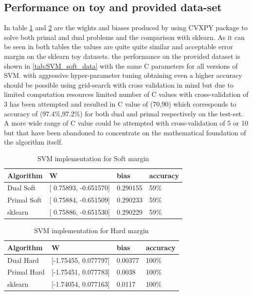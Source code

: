 \documentclass[10pt,twocolumn,letterpaper]{article}
\begin{document}
\subsection{Performance on toy and provided data-set}
In table \ref{tab:SVM_soft} and \ref{tab:SVM_hard} are the wights and biases produced by using CVXPY package to solve both primal and dual problems and the comparison with sklearn. As it can be seen in both tables the values are quite quite similar and acceptable error margin on the sklearn toy datasets. the performance on the provided dataset is shown in \ref{tab:SVM_soft_data} with the same C parameters for all versions of SVM. with aggressive hyper-parameter tuning obtaining even a higher accuracy should be possible using grid-search with cross validation in mind but due to limited computation resources limited number of C values with cross-validation of 3 has been attempted and resulted in C value of (70,90) which corresponds to accuracy of (97.4\%,97.2\%) for both dual and primal respectively on the test-set. A more wide range of C value could be attempted with cross-validation of 5 or 10 but that have been abandoned to concentrate on the mathematical foundation of the algorithm itself.


\begin{table}[htb]
\centering
\begin{tabular}{|l|l|l|l|} 
\toprule
Algorithm   & W                           & bias       & accuracy  \\ 
\hline
Dual Soft   & {[} 0.75893, -0.651570] & 0.290155 & 59\%      \\ 
\hline
Primal Soft & {[} 0.75884, -0.651509] & 0.290233 & 59\%      \\ 
\hline
sklearn     & {[} 0.75886, -0.651530] & 0.290229 & 59\%      \\
\bottomrule
\end{tabular}
\caption{SVM implementation for Soft margin}
\label{tab:SVM_soft}
\end{table}



\begin{table}[htb]
\centering
\begin{tabular}{|l|l|l|l|} 
\toprule
Algorithm   & W                        & bias      & accuracy  \\ 
\hline
Dual Hard   & {[}-1.75455, 0.077797] & 0.00377 & 100\%     \\ 
\hline
Primal Hard & {[}-1.75451, 0.077783]  & 0.0038 & 100\%     \\ 
\hline
sklearn     & {[}-1.74054, 0.077163]  & 0.0117 & 100\%     \\
\bottomrule
\end{tabular}
\caption{SVM implementation for Hard margin}
\label{tab:SVM_hard}
\end{table}
\end{document}
